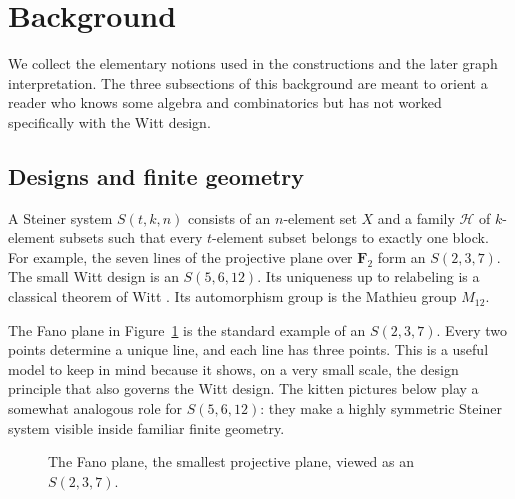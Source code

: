\documentclass[12pt,letterpaper]{article}
\theoremstyle{definition}\newtheorem{example}[theorem]{Example}
\numberwithin{equation}{section}
\newcommand{\F}{\mathbf F}
\begin{document}
\section{Background}\label{sec:background}
We collect the elementary notions used in the constructions and the later graph interpretation. The three subsections of this background are meant to orient a reader who knows some algebra and combinatorics but has not worked specifically with the Witt design.

\subsection{Designs and finite geometry}
A Steiner system $S(t,k,n)$ consists of an $n$-element set $X$ and a family $\mathcal H$ of $k$-element subsets such that every $t$-element subset belongs to exactly one block. For example, the seven lines of the projective plane over $\F_2$ form an $S(2,3,7)$. The small Witt design is an $S(5,6,12)$. Its uniqueness up to relabeling is a classical theorem of Witt \cite{Wi38}. Its automorphism group is the Mathieu group $M_{12}$.

The Fano plane in Figure~\ref{fig:fano} is the standard example of an $S(2,3,7)$. Every two points determine a unique line, and each line has three points. This is a useful model to keep in mind because it shows, on a very small scale, the design principle that also governs the Witt design. The kitten pictures below play a somewhat analogous role for $S(5,6,12)$: they make a highly symmetric Steiner system visible inside familiar finite geometry.

\begin{figure}[ht]
\centering
{}
\caption{The Fano plane, the smallest projective plane, viewed as an $S(2,3,7)$.}
\label{fig:fano}
\end{figure}
\end{document}
